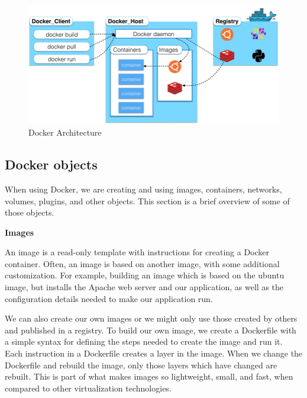 \begin{figure}[h]
	\begin{center}
		\includegraphics[height=10 cm,width=\linewidth]{images/docker_architecture.png}
		\caption{Docker Architecture}
	\end{center}
\end{figure}

\subsection{Docker objects}

When using Docker, we are creating and using images, containers, networks, volumes, plugins, and other objects. This section is a brief overview of some of those objects.


\onecolumn
\textbf{Images}

An image is a read-only template with instructions for creating a Docker container. Often, an image is based on another image, with some additional customization. For example, building an image which is based on the ubuntu image, but installs the Apache web server and our application, as well as the configuration details needed to make our application run.

We can also create our own images or we might only use those created by others and published in a registry. To build our own image, we create a Dockerfile with a simple syntax for defining the steps needed to create the image and run it. Each instruction in a Dockerfile creates a layer in the image. When we change the Dockerfile and rebuild the image, only those layers which have changed are rebuilt. This is part of what makes images so lightweight, small, and fast, when compared to other virtualization technologies.



